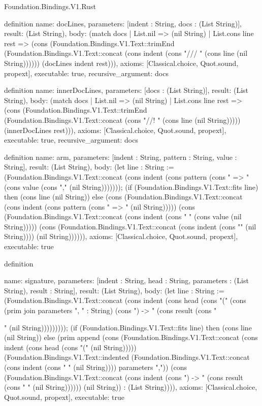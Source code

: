 \begin{lexlean}{Foundation.Bindings.V1.Rust}
\begin{semanticmodule}
definition{
  name: docLines,
  parameters: [indent : String, docs : (List String)],
  result: (List String),
  body: (match docs
    | List.nil => (nil String)
    | List.cons line rest => (cons (Foundation.Bindings.V1.Text::trimEnd (Foundation.Bindings.V1.Text::concat (cons indent (cons "/// " (cons line (nil String)))))) (docLines indent rest))),
  axioms: [Classical.choice, Quot.sound, propext],
  executable: true,
  recursive_argument: docs
}

definition{
  name: innerDocLines,
  parameters: [docs : (List String)],
  result: (List String),
  body: (match docs
    | List.nil => (nil String)
    | List.cons line rest => (cons (Foundation.Bindings.V1.Text::trimEnd (Foundation.Bindings.V1.Text::concat (cons "//! " (cons line (nil String))))) (innerDocLines rest))),
  axioms: [Classical.choice, Quot.sound, propext],
  executable: true,
  recursive_argument: docs
}

definition{
  name: arm,
  parameters: [indent : String, pattern : String, value : String],
  result: (List String),
  body: (let line : String := (Foundation.Bindings.V1.Text::concat (cons indent (cons pattern (cons " => " (cons value (cons "," (nil String))))))); (if (Foundation.Bindings.V1.Text::fits line) then (cons line (nil String)) else (cons (Foundation.Bindings.V1.Text::concat (cons indent (cons pattern (cons " => {" (nil String))))) (cons (Foundation.Bindings.V1.Text::concat (cons indent (cons "    " (cons value (nil String))))) (cons (Foundation.Bindings.V1.Text::concat (cons indent (cons "}" (nil String)))) (nil String)))))),
  axioms: [Classical.choice, Quot.sound, propext],
  executable: true
}

definition{
  name: signature,
  parameters: [indent : String, head : String, parameters : (List String), result : String],
  result: (List String),
  body: (let line : String := (Foundation.Bindings.V1.Text::concat (cons indent (cons head (cons "(" (cons (prim join parameters ", " : String) (cons ") -> " (cons result (cons " {" (nil String))))))))); (if (Foundation.Bindings.V1.Text::fits line) then (cons line (nil String)) else (prim append (cons (Foundation.Bindings.V1.Text::concat (cons indent (cons head (cons "(" (nil String))))) (Foundation.Bindings.V1.Text::indented (Foundation.Bindings.V1.Text::concat (cons indent (cons "    " (nil String)))) parameters ",")) (cons (Foundation.Bindings.V1.Text::concat (cons indent (cons ") -> " (cons result (cons " {" (nil String)))))) (nil String)) : (List String)))),
  axioms: [Classical.choice, Quot.sound, propext],
  executable: true
}

}}
\end{semanticmodule}
\end{lexlean}
